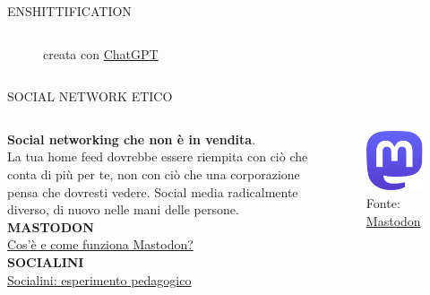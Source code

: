 \documentclass[aspectratio=1610]{beamer}
\begin{document}
\begin{frame}{ENSHITTIFICATION}
\begin{columns}
\begin{figure}
                \caption{{creata con \href{https://chatgpt.com}{ChatGPT}}}
            \end{figure}
    \end{columns}
\end{frame}

\begin{frame}{SOCIAL NETWORK ETICO}
    \begin{columns}
            \justifying
            \textbf{Social networking che non è in vendita}.\\
            La tua home feed dovrebbe essere riempita con ciò che conta di più per te, 
            non con ciò che una corporazione pensa che dovresti vedere. Social media 
            radicalmente diverso, di nuovo nelle mani delle persone.\\
            \bigskip
            \tiny{\textbf{MASTODON}}\\
            \tiny{\href{https://joinmastodon.org/it}{Cos'è e come funziona Mastodon?}}\\
            \bigskip
            \tiny{\textbf{SOCIALINI}}\\
            \tiny{\href{https://socialini.it/}{Socialini: esperimento pedagogico}}
            \begin{figure}
                \includegraphics[width=\linewidth]{img/mastodon.png}
                \caption{{Fonte: \href{https://joinmastodon.org/it}{Mastodon}}}
            \end{figure}
    \end{columns}
\end{frame}
\end{document}
